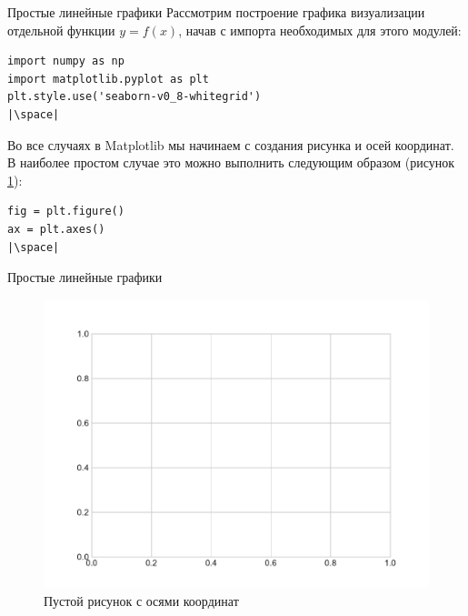 \documentclass[aspectratio=169, mathserif]{beamer}	%
\begin{document}
\begin{frame}[fragile, label=m]{Простые линейные графики}
\scriptsize
Рассмотрим построение графика визуализации отдельной функции $y = f(x)$, начав с импорта необходимых для этого модулей:
\vfill
\begin{verbatim}
import numpy as np
import matplotlib.pyplot as plt
plt.style.use('seaborn-v0_8-whitegrid')
|\space|
\end{verbatim}
\vfill
Во все случаях в Matplotlib мы начинаем с создания рисунка и осей координат. В наиболее простом случае это можно выполнить следующим образом (рисунок \ref{fig:fig_3}):
\vfill
\begin{verbatim}
fig = plt.figure()
ax = plt.axes()
|\space|
\end{verbatim}
\vfill
\end{frame}

\begin{frame}[fragile, label=m]{Простые линейные графики}
\scriptsize
\begin{figure}[h!]
	\centering
	\includegraphics[width=0.6\linewidth]{./pics/Figure_3}
	\caption{Пустой рисунок с осями координат}
	\label{fig:fig_3}
\end{figure}
\vfill
\end{frame}
\end{document}
